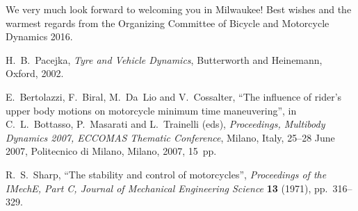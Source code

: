 \documentclass{bmd2016a}
\begin{document}
We very much look forward to welcoming you in Milwaukee! Best wishes and the warmest regards from the Organizing Committee of Bicycle and Motorcycle Dynamics 2016.


% 
% 
\begin{thebibliography}{6}
 H.~B.~Pacejka,
\textit{Tyre and Vehicle Dynamics},
Butterworth and Heinemann, Oxford, 2002.

 E.~Bertolazzi, F.~Biral, M.~Da~Lio and V.~Cossalter,
``The influence of rider's upper body motions on motorcycle minimum time
  maneuvering'',
in C.~L.~Bottasso, P.~Masarati and L.~Trainelli (eds),
\textit{Proceedings, Multibody Dynamics 2007, ECCOMAS Thematic Conference},
Milano, Italy, 25--28 June 2007,
Politecnico di Milano, Milano, 2007, 15~pp.

 R.~S.~Sharp,
``The stability and control of motorcycles'',
\textit{Proceedings of the IMechE, Part C, Journal of Mechanical Engineering
  Science} \textbf{13} (1971), pp.~316--329.

\end{thebibliography}
\end{document}
